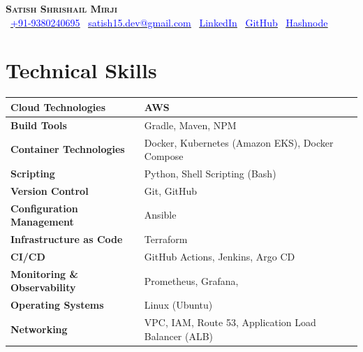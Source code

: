 \documentclass[letterpaper,11pt]{article}
\begin{document}
\begin{center}
    \textbf{\Huge \scshape Satish Shrishail Mirji} \\ \vspace{5pt}
    \normalsize
    \faMobile*\ \underline{\href{tel:+91-9380240695}{\textcolor{blue}{+91-9380240695}}} \quad
    \faEnvelope\ \underline{\href{mailto:satish15.dev@gmail.com}{\textcolor{blue}{satish15.dev@gmail.com}}} \quad
    \faLinkedin\ \underline{\href{https://www.linkedin.com/in/satish-m-a99b66334/}{\textcolor{blue}{LinkedIn}}} \quad
    \faGithub\ \underline{\href{https://github.com/techwithsatish}{\textcolor{blue}{GitHub}}} \quad
    \faBook\ \underline{\href{https://satish15.hashnode.dev/}{\textcolor{blue}{Hashnode}}}
\end{center}

\vspace{-5pt}





\section{Technical Skills}

\begin{tabular}{|p{6cm}|p{12cm}|}
\hline
\textbf{Cloud Technologies} & AWS \\ \hline
\textbf{Build Tools} & Gradle, Maven, NPM \\ \hline
\textbf{Container Technologies} & Docker, Kubernetes (Amazon EKS), Docker Compose \\ \hline
\textbf{Scripting} & Python, Shell Scripting (Bash) \\ \hline
\textbf{Version Control} & Git, GitHub \\ \hline
\textbf{Configuration Management} & Ansible \\ \hline
\textbf{Infrastructure as Code} & Terraform \\ \hline
\textbf{CI/CD} & GitHub Actions, Jenkins, Argo CD \\ \hline
\textbf{Monitoring \& Observability} & Prometheus, Grafana, \\ \hline
\textbf{Operating Systems} & Linux (Ubuntu) \\ \hline
\textbf{Networking} & VPC, IAM, Route 53, Application Load Balancer (ALB) \\ \hline
\end{tabular}


\end{document}
